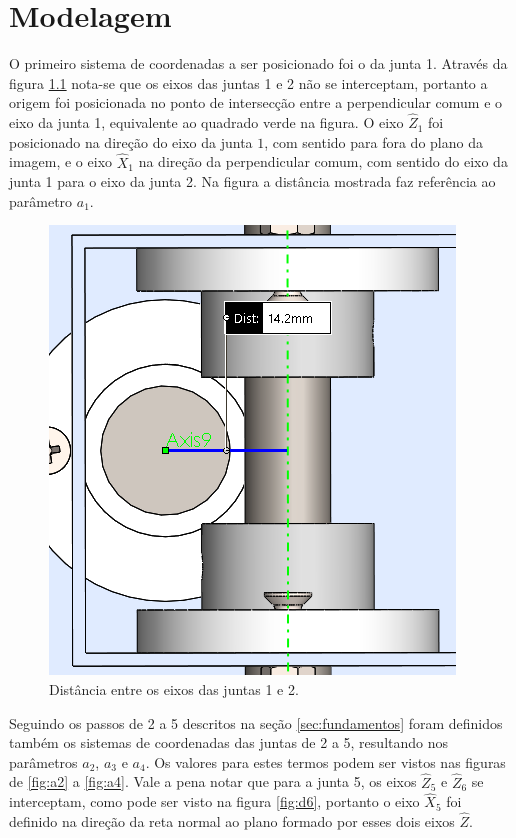 \chapter{Modelagem}

O primeiro sistema de coordenadas a ser posicionado foi o da junta 1. Através da figura \ref{fig:a1}
nota-se que os eixos das juntas 1 e 2 não se interceptam, portanto a origem foi posicionada no ponto 
de intersecção entre a perpendicular comum e o eixo da junta 1, equivalente ao quadrado verde na figura. 
O eixo $\hat{Z}_1$ foi posicionado na direção do eixo da junta $1$, com sentido para fora do plano da imagem,
e o eixo $\hat{X}_1$ na direção da perpendicular comum, com sentido do eixo da junta 1 para o eixo da junta 2.
Na figura a distância mostrada faz referência ao parâmetro $a_1$.

\begin{figure}[ht]
    \caption{Distância entre os eixos das juntas 1 e 2.}    
    \begin{centering}

        \includegraphics[width=0.5\columnwidth]{images/a1.png}
    
    \par\end{centering}

    \label{fig:a1}
\end{figure}

Seguindo os passos de 2 a 5 descritos na seção \ref{sec:fundamentos} foram definidos também os sistemas
de coordenadas das juntas de 2 a 5, resultando nos parâmetros $a_2$, $a_3$ e $a_4$. Os valores para estes
termos podem ser vistos nas figuras de \ref{fig:a2} a \ref{fig:a4}. 
Vale a pena notar que para a junta 5, os eixos $\hat{Z}_5$ e $\hat{Z}_6$ se interceptam, como pode ser
visto na figura \ref{fig:d6}, portanto o eixo $\hat{X}_5$ foi definido na direção da reta normal ao plano 
formado por esses dois eixos $\hat{Z}$.  

